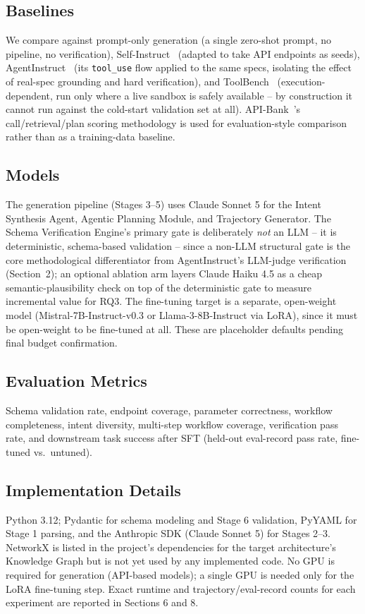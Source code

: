 \documentclass[11pt]{article}
\begin{document}
\subsection{Baselines}
We compare against prompt-only generation (a single zero-shot prompt, no pipeline, no
verification), Self-Instruct~\cite{wang2022selfinstruct} (adapted to take API endpoints as seeds),
AgentInstruct~\cite{mitra2024agentinstruct} (its \texttt{tool\_use} flow applied to the same
specs, isolating the effect of real-spec grounding and hard verification), and
ToolBench~\cite{qin2023toolbench} (execution-dependent, run only where a live sandbox is safely
available -- by construction it cannot run against the cold-start validation set at all).
API-Bank~\cite{li2023apibank}'s call/retrieval/plan scoring methodology is used for
evaluation-style comparison rather than as a training-data baseline.

\subsection{Models}
The generation pipeline (Stages 3--5) uses Claude Sonnet 5 for the Intent Synthesis Agent, Agentic
Planning Module, and Trajectory Generator. The Schema Verification Engine's primary gate is
deliberately \textit{not} an LLM -- it is deterministic, schema-based validation -- since a
non-LLM structural gate is the core methodological differentiator from AgentInstruct's LLM-judge
verification (Section~2); an optional ablation arm layers Claude Haiku 4.5 as a cheap
semantic-plausibility check on top of the deterministic gate to measure incremental value for RQ3.
The fine-tuning target is a separate, open-weight model (Mistral-7B-Instruct-v0.3 or
Llama-3-8B-Instruct via LoRA), since it must be open-weight to be fine-tuned at all. These are
placeholder defaults pending final budget confirmation.

\subsection{Evaluation Metrics}
Schema validation rate, endpoint coverage, parameter correctness, workflow completeness, intent
diversity, multi-step workflow coverage, verification pass rate, and downstream task success after
SFT (held-out eval-record pass rate, fine-tuned vs.\ untuned).

\subsection{Implementation Details}
Python 3.12; Pydantic for schema modeling and Stage 6 validation, PyYAML for Stage 1 parsing, and
the Anthropic SDK (Claude Sonnet 5) for Stages 2--3. NetworkX is listed in the project's
dependencies for the target architecture's Knowledge Graph but is not yet used by any implemented
code. No GPU is required for generation (API-based models); a single GPU is needed only for the
LoRA fine-tuning step. Exact runtime and trajectory/eval-record counts for each experiment are
reported in Sections 6 and 8.
\end{document}
